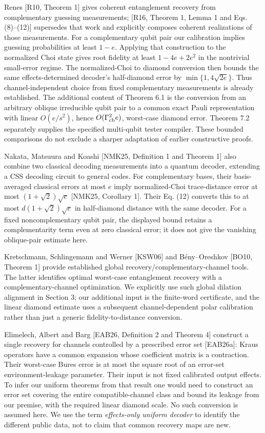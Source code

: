\documentclass[11pt]{article}
\begin{document}
Renes [R10, Theorem 1] gives coherent entanglement recovery from complementary
guessing measurements; [R16, Theorem 1, Lemma 1 and Eqs. (8)--(12)] supersedes
that work and explicitly composes coherent realizations of those measurements.
For a complementary qubit pair our calibration implies guessing probabilities
at least \(1-e\). Applying that construction to the normalized Choi state
gives root fidelity at least \(1-4e+2e^2\) in the nontrivial small-error
regime. The normalized-Choi to diamond conversion then bounds the same
effects-determined decoder's half-diamond error by
\(\min\{1,4\sqrt{2e}\}\). Thus channel-independent choice from fixed
complementary measurements is already established. The additional content
of Theorem 6.1 is the conversion from an arbitrary oblique irreducible qubit
pair to a common exact Pauli representation with linear \(O(e/s^2)\),
hence \(O(\Gamma_{\rm cb}^2e)\), worst-case diamond error. Theorem 7.2
separately supplies the specified multi-qubit tester compiler. These bounded
comparisons do not exclude a sharper adaptation of earlier constructive proofs.

Nakata, Matsuura and Koashi [NMK25, Definition 1 and Theorem 1] also combine
two classical decoding measurements into a quantum decoder, extending a
CSS decoding circuit to general codes. For complementary bases, their
basis-averaged classical errors at most \(e\) imply normalized-Choi
trace-distance error at most \((1+\sqrt2)\sqrt e\) [NMK25, Corollary 1].
Their Eq. (12) converts this to at most \(d(1+\sqrt2)\sqrt e\) in
half-diamond distance with the same decoder. For a fixed noncomplementary
qubit pair, the displayed bound retains a complementarity term even at zero
classical error; it does not give the vanishing oblique-pair estimate here.

Kretschmann, Schlingemann and Werner [KSW06] and Bény--Oreshkov [BO10,
Theorem 1] provide established global recovery/complementary-channel tools.
The latter identifies optimal worst-case entanglement recovery with a
complementary-channel optimization. We explicitly use such global dilation
alignment in Section 3; our additional input is the finite-word certificate,
and the linear diamond estimate uses a subsequent channel-dependent polar
calibration rather than just a generic fidelity-to-distance conversion.

Elimelech, Albert and Barg [EAB26, Definition 2 and Theorem 4] construct a
single recovery for channels controlled by a prescribed error set [EAB26a]: Kraus
operators have a common expansion whose coefficient matrix is a contraction.
Their worst-case Bures error is at most the square root of an error-set
environment-leakage parameter. Their input is not fixed calibrated output
effects. To infer our uniform theorems from that result one would need to
construct an error set covering the entire compatible-channel class and
bound its leakage from our premise, with the required linear diamond scale.
No such conversion is assumed here. We use the term \emph{effects-only uniform
decoder} to identify the different public data, not to claim that common
recovery maps are new.
\end{document}
